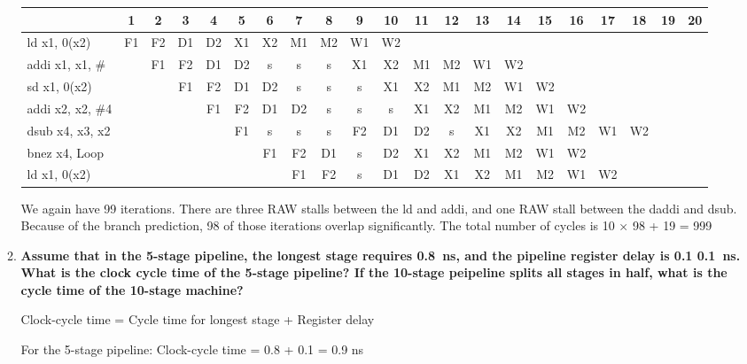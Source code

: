 \begin{enumerate}
\begin{enumerate}
        \begin{center}
            \begin{tabular}{|l|*{20}{c|}}
                \hline
                \multicolumn{1}{|c|}{} & 1 & 2 & 3 & 4 & 5 & 6 & 7 & 8 & 9 & 10 & 11 & 12 & 13 & 14 & 15 & 16 & 17 & 18 & 19 & 20 \\
                \hline
                ld x1, 0(x2) & F1 & F2 & D1 & D2 & X1 & X2 & M1 & M2 & W1 & W2 & & & & & & & & & & \\
                \hline
                addi x1, x1, \# & & F1 & F2 & D1 & D2 & s & s & s & X1 & X2 & M1 & M2 & W1 & W2 & & & & & & \\
                \hline
                sd x1, 0(x2) & & & F1 & F2 & D1 & D2 & s & s & s & X1 & X2 & M1 & M2 & W1 & W2 & & & & & \\
                \hline
                addi x2, x2, \#4 & & & & F1 & F2 & D1 & D2 & s & s & s & X1 & X2 & M1 & M2 & W1 & W2 & & & & \\
                \hline
                dsub x4, x3, x2 & & & & & F1 & s & s & s & F2 & D1 & D2 & s & X1 & X2 & M1 & M2 & W1 & W2 & & \\
                \hline
                bnez x4, Loop & & & & & & F1 & F2 & D1 & s & D2 & X1 & X2 & M1 & M2 & W1 & W2 & & & & \\
                \hline
                ld x1, 0(x2) & & & & & & & F1 & F2 & s & D1 & D2 & X1 & X2 & M1 & M2 & W1 & W2 & & & \\
                \hline
            \end{tabular}
        \end{center}
        
        We again have 99 iterations. There are three RAW stalls between the ld and addi, and one RAW stall between the daddi and dsub. Because of the branch prediction, 98 of those iterations overlap significantly. The total number of cycles is 10 × 98 + 19 = 999

        \item \textbf{Assume that in the 5-stage pipeline, the longest stage requires \SI{0.8}{ns}, and the pipeline register delay is 0.1 \SI{0.1}{ns}. What is the clock cycle time of the 5-stage pipeline? If the 10-stage peipeline splits all stages in half, what is the cycle time of the 10-stage machine?}
        
        Clock-cycle time = Cycle time for longest stage + Register delay
        
        For the 5-stage pipeline:
        Clock-cycle time = 0.8 + 0.1 = 0.9 ns
        

\end{enumerate}
\end{enumerate}
